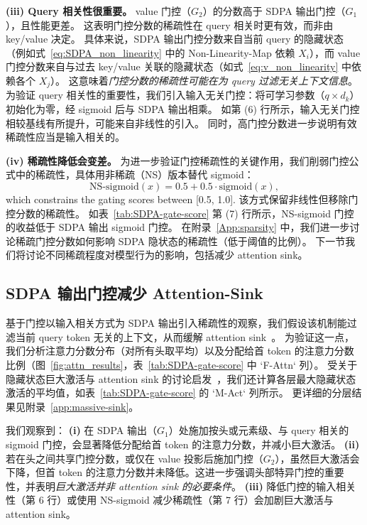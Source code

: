 \documentclass{article} %
\begin{document}
\textbf{(iii) Query 相关性很重要。} value 门控（$G_2$）的分数高于 SDPA 输出门控（$G_1$），且性能更差。
这表明门控分数的稀疏性在 query 相关时更有效，而非由 key/value 决定。
具体来说，SDPA 输出门控分数来自当前 query 的隐藏状态（例如式~\ref{eq:SDPA_non_linearity} 中的 Non-Linearity-Map 依赖 $X_i$），而 value 门控分数来自与过去 key/value 关联的隐藏状态（如式~\ref{eq:v_non_linearity} 中依赖各个 $X_j$）。
这意味着\textit{门控分数的稀疏性可能在为 query 过滤无关上下文信息}。
为验证 query 相关性的重要性，我们引入输入无关门控：将可学习参数（$q \times d_k$）初始化为零，经 sigmoid 后与 SDPA 输出相乘。
如第 (6) 行所示，输入无关门控相较基线有所提升，可能来自非线性的引入。
同时，高门控分数进一步说明有效稀疏性应当是输入相关的。


\textbf{(iv) 稀疏性降低会变差。} 为进一步验证门控稀疏性的关键作用，我们削弱门控公式中的稀疏性，具体用非稀疏（NS）版本替代 sigmoid：
$$
\text{NS-sigmoid}(x) = 0.5 + 0.5 \cdot \text{sigmoid}(x),
$$  
which constrains the gating scores between [0.5, 1.0]. 
该方式保留非线性但移除门控分数的稀疏性。
如表~\ref{tab:SDPA-gate-score} 第 (7) 行所示，NS-sigmoid 门控的收益低于 SDPA 输出 sigmoid 门控。
在附录~\ref{App:sparsity} 中，我们进一步讨论稀疏门控分数如何影响 SDPA 隐状态的稀疏性（低于阈值的比例）。
下一节我们将讨论不同稀疏程度对模型行为的影响，包括减少 attention sink。

\subsection{SDPA 输出门控减少 Attention-Sink}
\label{sec:sink}

基于门控以输入相关方式为 SDPA 输出引入稀疏性的观察，我们假设该机制能过滤当前 query token 无关的上下文，从而缓解 attention sink~\citep{xiao2023efficient, sun2024massive}。
为验证这一点，我们分析注意力分数分布（对所有头取平均）以及分配给首 token 的注意力分数比例（图~\ref{fig:attn_results}，表~\ref{tab:SDPA-gate-score} 中 `F-Attn` 列）。
受关于隐藏状态巨大激活与 attention sink 的讨论启发~\citep{sun2024massive}，我们还计算各层最大隐藏状态激活的平均值，如表~\ref{tab:SDPA-gate-score} 的 `M-Act` 列所示。
更详细的分层结果见附录~\ref{app:massive-sink}。

我们观察到：
\textbf{(i)} 在 SDPA 输出（$G_1$）处施加按头或元素级、与 query 相关的 sigmoid 门控，会显著降低分配给首 token 的注意力分数，并减小巨大激活。
\textbf{(ii)} 若在头之间共享门控分数，或仅在 value 投影后施加门控（$G_2$），虽然巨大激活会下降，但首 token 的注意力分数并未降低。这进一步强调头部特异门控的重要性，并表明\textit{巨大激活并非 attention sink 的必要条件}。
\textbf{(iii)} 降低门控的输入相关性（第 6 行）或使用 NS-sigmoid 减少稀疏性（第 7 行）会加剧巨大激活与 attention sink。
\end{document}
